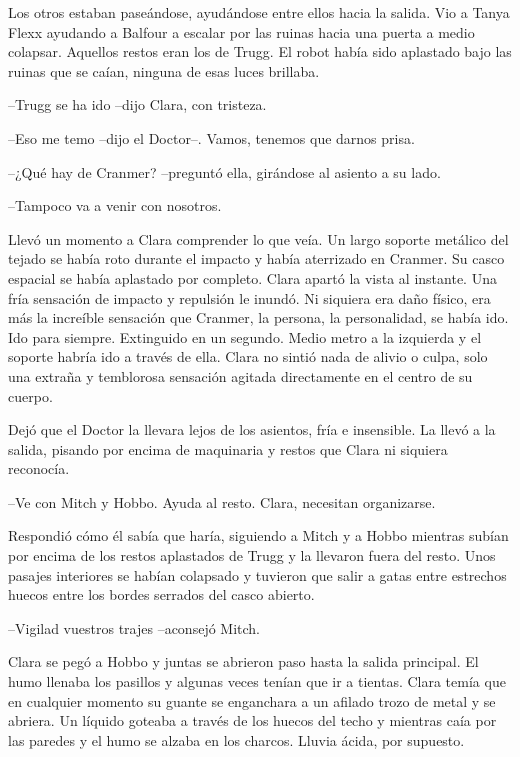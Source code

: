 {Los otros estaban paseándose, ayudándose entre ellos hacia la salida.
 Vio a Tanya Flexx ayudando a Balfour a escalar por las ruinas hacia una
 puerta a medio colapsar. Aquellos restos eran los de Trugg. El robot
 había sido aplastado bajo las ruinas que se caían, ninguna de esas luces
brillaba.}

{--Trugg se ha ido --dijo Clara, con tristeza.}

{--Eso me temo --dijo el Doctor--. Vamos, tenemos que darnos prisa.}

{--¿Qué hay de Cranmer? --preguntó ella, girándose al asiento a su
lado.}

{--Tampoco va a venir con nosotros.}

{Llevó un momento a Clara comprender lo que veía. Un largo soporte
 metálico del tejado se había roto durante el impacto y había aterrizado
 en Cranmer. Su casco espacial se había aplastado por completo. Clara
 apartó la vista al instante. Una fría sensación de impacto y repulsión
 le inundó. Ni siquiera era daño físico, era más la increíble sensación
 que Cranmer, la persona, la personalidad, se había ido. Ido para
 siempre. Extinguido en un segundo. Medio metro a la izquierda y el
 soporte habría ido a través de ella. Clara no sintió nada de alivio o
 culpa, solo una extraña y temblorosa sensación agitada directamente en
el centro de su cuerpo.}

{Dejó que el Doctor la llevara lejos de los asientos, fría e insensible.
 La llevó a la salida, pisando por encima de maquinaria y restos que
Clara ni siquiera reconocía.}

{--Ve con Mitch y Hobbo. Ayuda al resto. Clara, necesitan organizarse.}

{Respondió cómo él sabía que haría, siguiendo a Mitch y a Hobbo mientras
 subían por encima de los restos aplastados de Trugg y la llevaron fuera
 del resto. Unos pasajes interiores se habían colapsado y tuvieron que
 salir a gatas entre estrechos huecos entre los bordes serrados del casco
abierto.}

{--Vigilad vuestros trajes --aconsejó Mitch.}

{Clara se pegó a Hobbo y juntas se abrieron paso hasta la salida
 principal. El humo llenaba los pasillos y algunas veces tenían que ir a
 tientas. Clara temía que en cualquier momento su guante se enganchara a
 un afilado trozo de metal y se abriera. Un líquido goteaba a través de
 los huecos del techo y mientras caía por las paredes y el humo se alzaba
en los charcos. Lluvia ácida, por supuesto.}

